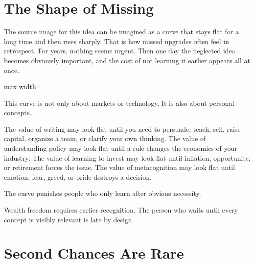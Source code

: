 \section*{The Shape of Missing}

The source image for this idea can be imagined as a curve that stays flat for a long time and then rises sharply. That is how missed upgrades often feel in retrospect. For years, nothing seems urgent. Then one day the neglected idea becomes obviously important, and the cost of not learning it earlier appears all at once.

\begin{center}
\begin{adjustbox}{max width=\linewidth}
\end{adjustbox}
\end{center}

This curve is not only about markets or technology. It is also about personal concepts.

The value of writing may look flat until you need to persuade, teach, sell, raise capital, organize a team, or clarify your own thinking. The value of understanding policy may look flat until a rule changes the economics of your industry. The value of learning to invest may look flat until inflation, opportunity, or retirement forces the issue. The value of metacognition may look flat until emotion, fear, greed, or pride destroys a decision.

The curve punishes people who only learn after obvious necessity.

Wealth freedom requires earlier recognition. The person who waits until every concept is visibly relevant is late by design.

\section*{Second Chances Are Rare}

